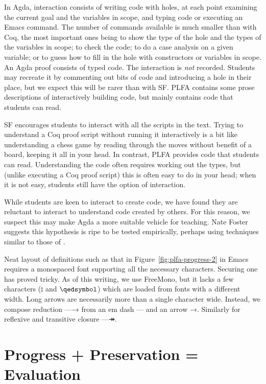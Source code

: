 \documentclass[preprint,authoryear]{elsarticle}
\begin{document}
In Agda, interaction consists of writing code with holes, at each
point examining the current goal and the variables in scope, and
typing code or executing an Emacs command.  The number of commands
available is much smaller than with Coq, the most important ones being
to show the type of the hole and the types of the variables in scope;
to check the code; to do a case analysis on a given variable; or to
guess how to fill in the hole with constructors or variables in scope.
An Agda proof consists of typed code.  The interaction is \emph{not}
recorded.  Students may recreate it by commenting out bits of code and
introducing a hole in their place, but we expect this will be rarer
than with SF.  PLFA contains some prose descriptions of interactively
building code, but mainly contains code that students can read.

SF encourages students to interact with all the scripts in the text.
Trying to understand a Coq proof script without running it
interactively is a bit like understanding a chess game by reading
through the moves without benefit of a board, keeping it all in your
head.  In contrast, PLFA provides code that students can read.
Understanding the code often requires working out the types, but
(unlike executing a Coq proof script) this is often easy to do in your
head; when it is not easy, students still have the option of
interaction.

While students are keen to interact to create code, we have found they
are reluctant to interact to understand code created by others. For
this reason, we suspect this may make Agda a more suitable vehicle for
teaching.  Nate Foster suggests this hypothesis is ripe to be tested
empirically, perhaps using techniques similar to those of
\citet{Danas-et-al-2017}.

Neat layout of definitions such as that in
Figure~\ref{fig:plfa-progress-2} in Emacs requires a monospaced font
supporting all the necessary characters.  Securing one has proved
tricky. As of this writing, we use FreeMono, but it lacks a few
characters ($\typecolon$ and $\qedsymbol$) which are loaded from fonts with a different
width.  Long arrows are necessarily more than a single character wide.
Instead, we compose reduction —→ from an em dash — and an arrow →.
Similarly for reflexive and transitive closure —↠.

\section{Progress + Preservation = Evaluation}
\end{document}
